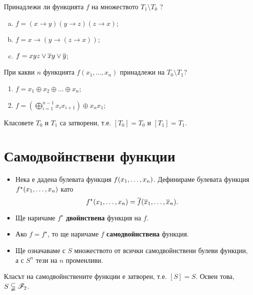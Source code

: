 \begin{problem}%
  Принадлежи ли функцията $f$ на множеството $T_1 \setminus T_0$ ?
  \begin{enumerate}[a)]
  \item
    $f = (x\rightarrow y)(y\rightarrow z)(z\rightarrow x)$;
  \item
    $f = x\rightarrow(y\rightarrow (z\rightarrow x))$;
  \item
    $f = xyz \vee \overline{x}y \vee \overline{y}$;
  \end{enumerate}
\end{problem}

\begin{problem}
  При какви $n$ функцията $f(x_1,\dots, x_n)$ принадлежи на $T_0\setminus T_1$?
  \begin{enumerate}[1)]
  \item
    $f = x_1\oplus x_2 \oplus\dots\oplus x_n$;
  \item
    $f = (\bigoplus^{n-1}_{i=1} x_ix_{i+1})\oplus x_nx_1$;
  \end{enumerate}
\end{problem}

\begin{prop}
  Класовете $T_0$ и $T_1$ са затворени, т.е. $[T_0] = T_0$ и $[T_1] = T_1$.
\end{prop}


\section{Самодвойнствени функции}

\begin{itemize}
\item 
  Нека е дадена булевата функция $f(x_{1},\dots,x_{n})$. Дефинираме булевата функция $f^\star(x_{1},\dots,x_{n})$ като
  \[f^\star(x_{1},\dots,x_{n}) = \overline{f}(\overline{x}_1,\dots,\overline{x}_n).\]
\item
  Ще наричаме $f^\star$ {\bf двойнствена} функция на $f$.
\item
  Ако $f = f^\star$, то ще наричаме $f$ {\bf самодвойнствена} функция.
\item
  Ще означаваме с $S$ множеството от всички самодвойнствени булеви функции, а с $S^n$ тези на $n$ променливи.
\end{itemize}

\begin{prop}
  Класът на самодвойнствените функции е затворен, т.е. $[S] = S$.
  Освен това, $S \subsetneqq \mathscr{F}_2$.
\end{prop}


